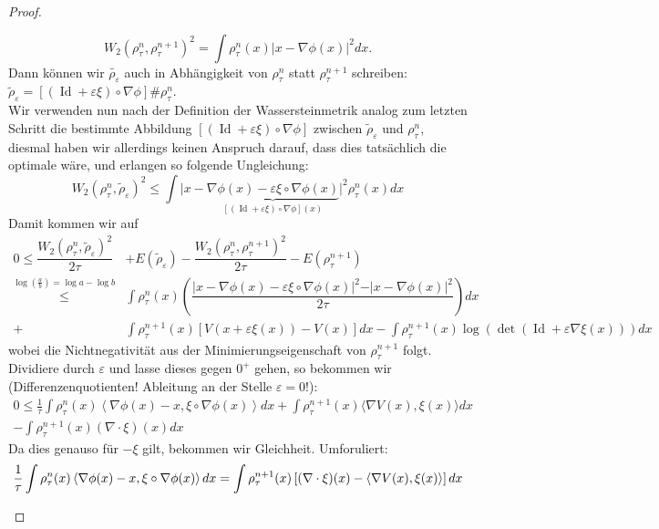 \documentclass[11pt,a4paper,notitlepage]{scrreprt}
\begin{document}
\begin{proof}
\begin{enumerate}
\begin{equation}
W_2(\rho_\tau^n,\rho_\tau^{n+1})^2=\int \rho_\tau^n(x)\vert x-\nabla\phi(x)\vert^2 dx.
\end{equation}
Dann können wir $\tilde{\rho_\varepsilon}$ auch in Abhängigkeit von $\rho_\tau^n$ statt $\rho_\tau^{n+1}$ schreiben: $\tilde{\rho}_\varepsilon=[(\operatorname{Id}+\varepsilon\xi)\circ\nabla\phi]\#\rho_\tau^n$.\\
Wir verwenden nun nach der Definition der Wassersteinmetrik analog zum letzten Schritt die bestimmte Abbildung $[(\operatorname{Id}+\varepsilon\xi)\circ\nabla\phi]$ zwischen $\tilde{\rho}_\varepsilon$ und $\rho_\tau^n$, diesmal haben wir allerdings keinen Anspruch darauf, dass dies tatsächlich die optimale wäre, und erlangen so folgende Ungleichung:
\begin{equation*}
W_2(\rho_\tau^n,\tilde{\rho}_\varepsilon)^2 \leq \int \vert x-\underset{[(\operatorname{Id}+\varepsilon\xi)\circ\nabla\phi](x)}{\underbrace{\nabla \phi(x)-\varepsilon\xi\circ\nabla\phi(x)}}\vert^2 \rho_\tau^n(x)dx
\end{equation*}
Damit kommen wir auf
\begin{align}
0\leq\dfrac{W_2(\rho_\tau^n,\tilde{\rho}_\varepsilon)^2}{2\tau}&+E(\tilde{\rho}_\varepsilon)-\dfrac{W_2(\rho_\tau^n,\rho_\tau^{n+1})^2}{2\tau}-E(\rho_\tau^{n+1})\\
\overset{\log(\frac{a}{b})=\log a-\log b}\leq&\int\rho_\tau^n(x)\left(\dfrac{\vert x-\nabla \phi(x)-\varepsilon\xi\circ\nabla\phi(x)\vert^2-\vert x-\nabla\phi(x)\vert^2}{2\tau}\right)dx\\
+&\int\rho_\tau^{n+1}(x)[V(x+\varepsilon\xi(x))-V(x)]dx-\int\rho_\tau^{n+1}(x)\log( \det(\operatorname{Id}+\varepsilon\nabla\xi(x)))dx
\end{align}
wobei die Nichtnegativität aus der Minimierungseigenschaft von $\rho_\tau^{n+1}$ folgt.\\
Dividiere durch $\varepsilon$ und lasse dieses gegen $0^+$ gehen, so bekommen wir (Differenzenquotienten! Ableitung an der Stelle $\varepsilon=0$!): 
\begin{align*}
0\leq\frac{1}{\tau} \int \rho_\tau^n(x)\left\langle\nabla\phi(x)-x,\xi\circ\nabla\phi(x)\right\rangle dx+\int\rho_\tau^{n+1}(x)\langle\nabla V(x),\xi(x)\rangle dx\\-\int\rho_\tau^{n+1}(x)(\nabla\cdot \xi)(x)dx
\end{align*}
Da dies genauso für $-\xi$ gilt, bekommen wir Gleichheit. Umforuliert:
\begin{equation}
\frac{1}{\tau} \int \rho_\tau^n(x)\left\langle\nabla\phi(x)-x,\xi\circ\nabla\phi(x)\right\rangle dx\\=\int\rho_\tau^{n+1}(x)\left[(\nabla\cdot \xi)(x)-\langle\nabla V(x),\xi(x)\rangle \right]dx \label{eqwithxi}

\end{equation}
\end{enumerate}
\end{proof}
\end{document}
